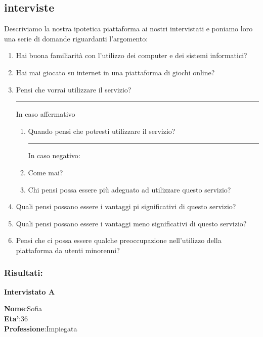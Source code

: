 \documentclass[../Report.tex]{subfiles}
\begin{document}
    
    \subsection{interviste}
    Descriviamo la nostra ipotetica piattaforma ai nostri intervistati e poniamo loro una serie di domande riguardanti l’argomento:
   
    \begin{enumerate}
    \item Hai buona familiarità con l’utilizzo dei computer e dei sistemi informatici?
    \item Hai mai giocato su internet in una piattaforma di giochi online?
    \item Pensi che vorrai utilizzare il servizio?\\
        \hrule In caso affermativo\\
        \begin{enumerate}
            \item Quando pensi che potresti utilizzare il servizio?\\ \hrule In caso negativo: 
            \item Come mai?
            \item Chi pensi possa essere più adeguato ad utilizzare questo servizio?
        \end{enumerate}
    \item	Quali pensi possano essere i vantaggi pi significativi di questo servizio?
    \item	Quali pensi possano essere i vantaggi meno significativi di questo servizio?
    \item	Pensi che ci possa essere qualche preoccupazione nell’utilizzo della piattaforma da utenti minorenni?
    \end{enumerate}

    \newpage

    \subsubsection{Risultati:}
    
    \textbf{Intervistato A}

    \textbf{Nome}:Sofia\\
    \textbf{Eta'}:36\\
    \textbf{Professione}:Impiegata\\
    
\end{document}
